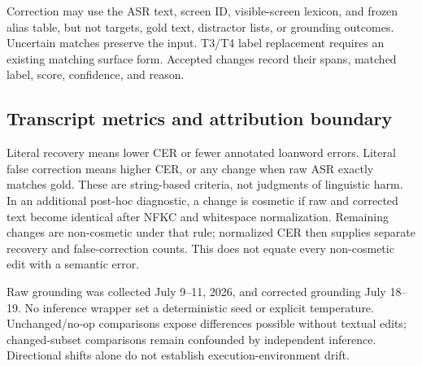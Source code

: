 Correction may use the ASR text, screen ID, visible-screen lexicon, and frozen alias table, but not targets, gold text, distractor lists, or grounding outcomes. Uncertain matches preserve the input. T3/T4 label replacement requires an existing matching surface form. Accepted changes record their spans, matched label, score, confidence, and reason.

\subsection{Transcript metrics and attribution boundary}

Literal recovery means lower CER or fewer annotated loanword errors. Literal false correction means higher CER, or any change when raw ASR exactly matches gold. These are string-based criteria, not judgments of linguistic harm. In an additional post-hoc diagnostic, a change is cosmetic if raw and corrected text become identical after NFKC and whitespace normalization. Remaining changes are non-cosmetic under that rule; normalized CER then supplies separate recovery and false-correction counts. This does not equate every non-cosmetic edit with a semantic error.

Raw grounding was collected July 9--11, 2026, and corrected grounding July 18--19. No inference wrapper set a deterministic seed or explicit temperature. Unchanged/no-op comparisons expose differences possible without textual edits; changed-subset comparisons remain confounded by independent inference. Directional shifts alone do not establish execution-environment drift.
